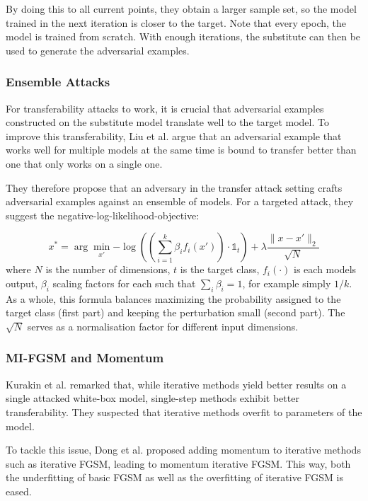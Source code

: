 \documentclass[review]{AIM_report}
\begin{document}
By doing this to all current points, they obtain a larger sample set, so the model trained in the next iteration is closer to the target. Note that every epoch, the model is trained from scratch. With enough iterations, the substitute can then be used to generate the adversarial examples.

\subsubsection{Ensemble Attacks}
For transferability attacks to work, it is crucial that adversarial examples constructed on the substitute model translate well to the target model. To improve this transferability, Liu et al. \cite{liu2016delving} argue that an adversarial example that works well for multiple models at the same time is bound to transfer better than one that only works on a single one.

They therefore propose that an adversary in the transfer attack setting crafts adversarial examples against an ensemble of models. For a targeted attack, they suggest the negative-log-likelihood-objective:

\[
x^{*} = \arg\min_{x'}{-\log((\sum_{i=1}^k \beta_i f_i(x')) \cdot \mathbb{1}_{t}) + \lambda \frac{\lVert x - x'\rVert_2}{\sqrt{N}}}
\]
where \(N\) is the number of dimensions, \(t\) is the target class, \(f_i(\cdot)\) is each models output, \(\beta_i\) scaling factors for each such that \(\sum_i\beta_i=1\), for example simply \(1/k\). As a whole, this formula balances maximizing the probability assigned to the target class (first part) and keeping the perturbation small (second part). The \(\sqrt{N}\) serves as a normalisation factor for different input dimensions.

\subsubsection{MI-FGSM and Momentum}
\label{sssec:momentum}
Kurakin et al. \cite{kurakin2016adversarial} remarked that, while iterative methods yield better results on a single attacked white-box model, single-step methods exhibit better transferability. They suspected that iterative methods overfit to parameters of the model.

To tackle this issue, Dong et al. \cite{dong2018boosting} proposed adding momentum to iterative methods such as iterative FGSM, leading to momentum iterative FGSM. This way, both the underfitting of basic FGSM as well as the overfitting of iterative FGSM is eased.
\end{document}
